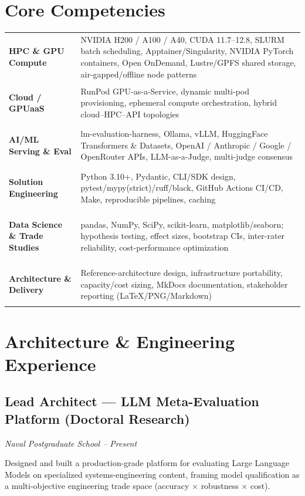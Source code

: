 \documentclass[10pt,letterpaper]{article}
\newcommand{\skillrow}[2]{\textbf{#1} & #2 \\[2pt]}
\begin{document}
\section{Core Competencies}
\renewcommand{\arraystretch}{1.15}
\begin{tabularx}{\textwidth}{>{\bfseries\raggedright\arraybackslash}p{} X}
\skillrow{HPC \& GPU Compute}{NVIDIA H200 / A100 / A40, CUDA 11.7--12.8, SLURM batch scheduling, Apptainer/Singularity, NVIDIA PyTorch containers, Open OnDemand, Lustre/GPFS shared storage, air-gapped/offline node patterns}
\skillrow{Cloud / GPUaaS}{RunPod GPU-as-a-Service, dynamic multi-pod provisioning, ephemeral compute orchestration, hybrid cloud--HPC--API topologies}
\skillrow{AI/ML Serving \& Eval}{lm-evaluation-harness, Ollama, vLLM, HuggingFace Transformers \& Datasets, OpenAI / Anthropic / Google / OpenRouter APIs, LLM-as-a-Judge, multi-judge consensus}
\skillrow{Solution Engineering}{Python 3.10+, Pydantic, CLI/SDK design, pytest/mypy(strict)/ruff/black, GitHub Actions CI/CD, Make, reproducible pipelines, caching}
\skillrow{Data Science \& Trade Studies}{pandas, NumPy, SciPy, scikit-learn, matplotlib/seaborn; hypothesis testing, effect sizes, bootstrap CIs, inter-rater reliability, cost-performance optimization}
\skillrow{Architecture \& Delivery}{Reference-architecture design, infrastructure portability, capacity/cost sizing, MkDocs documentation, stakeholder reporting (LaTeX/PNG/Markdown)}
\end{tabularx}

\section{Architecture \& Engineering Experience}

\subsection{Lead Architect --- LLM Meta-Evaluation Platform (Doctoral Research)}
\textit{\small Naval Postgraduate School \quad\textbar{} -- Present}

Designed and built a production-grade platform for evaluating Large Language Models on
specialized systems-engineering content, framing model qualification as a multi-objective
engineering trade space (accuracy $\times$ robustness $\times$ cost).
\end{document}
